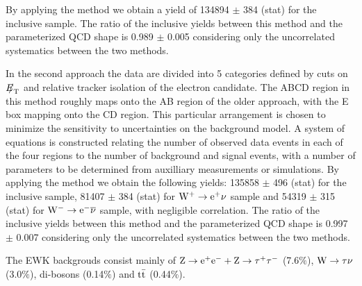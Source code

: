 
By applying the method we obtain a yield of 134894 $\pm$ 384 (stat) for the inclusive sample. 
The ratio of the inclusive yields between this method and the parameterized QCD shape is
0.989 $\pm$ 0.005 considering only the uncorrelated systematics between the two methods. 

In the second approach the data are divided into 5 categories defined by cuts 
on ${E\!\!\!/}_{\mathrm{T}}$ and relative tracker isolation of the electron candidate.
The ABCD region in this method roughly maps onto the AB region of the older approach, 
with the E box mapping onto the CD region. This particular arrangement is chosen to minimize 
the sensitivity to uncertainties on the background model. A system of equations is constructed 
relating the number of observed data events in each of the four regions to the number of 
background and signal events, with a number of parameters to be determined from auxilliary 
measurements or simulations. By applying the method we obtain the following yields:
135858 $\pm$ 496 (stat) for the inclusive sample, 81407 $\pm$ 384 (stat) for $\mathrm{W^+} \rightarrow \mathrm{e}^+\nu$ sample and
54319 $\pm$ 315 (stat) for $\mathrm{W^-} \rightarrow \mathrm{e}^-\overline{\nu}$ sample, with negligible correlation.
The ratio of the inclusive yields between this method and the parameterized QCD shape is
0.997 $\pm$ 0.007 considering only the uncorrelated systematics between the two methods. 

The EWK backgrouds consist mainly of $\mathrm{Z} \rightarrow \mathrm{e}^+\mathrm{e}^-+\mathrm{Z} \rightarrow \tau^+\tau^-$ (7.6$\%$), $\mathrm{W} \rightarrow \tau\nu$ (3.0$\%$), 
di-bosons (0.14$\%$) and $\mathrm{t}\bar{\mathrm{t}}$ (0.44$\%$).

